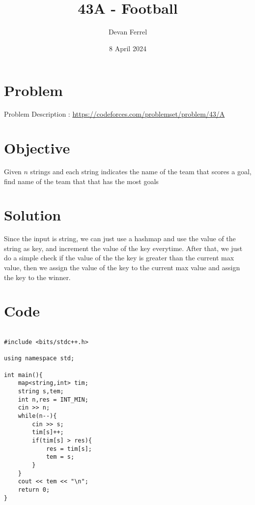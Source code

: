 \documentclass{article}
\title{43A - Football}
\author{Devan Ferrel}
\date{8 April 2024}
\begin{document}
\maketitle


\section{Problem}

Problem Description : \href{https://codeforces.com/problemset/problem/43/A}{https://codeforces.com/problemset/problem/43/A}

\section{Objective}

Given $n$ strings and each string indicates the name of the team that scores a goal, find name of the team that that has the most goals

\section{Solution}

Since the input is string, we can just use a hashmap and use the value of the string as key, and increment the value of the key everytime. After that, we just do a simple check if the value of the the key is greater than the current max value, then we assign the value of the key to the current max value and assign the key to the winner.

\newpage
\section{Code}


\begin{lstlisting}

#include <bits/stdc++.h>

using namespace std;

int main(){
    map<string,int> tim;
    string s,tem;
    int n,res = INT_MIN;
    cin >> n;
    while(n--){
        cin >> s;
        tim[s]++;
        if(tim[s] > res){
            res = tim[s];
            tem = s;
        }
    }
    cout << tem << "\n";
    return 0;
}
\end{lstlisting}
\end{document}
